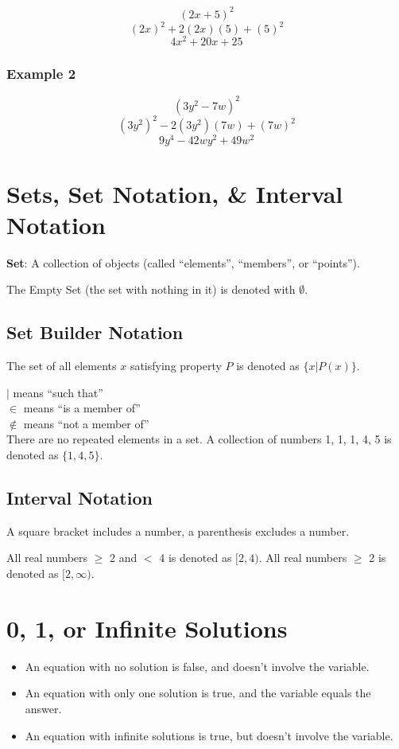\documentclass{article}
\begin{document}
$$(2x + 5)^2$$
$$(2x)^2 + 2(2x)(5) + (5)^2$$
$$4x^2 + 20x + 25$$

\subsubsection{Example 2}
$$ (3y^2 - 7w)^2 $$
$$ (3y^2)^2 - 2(3y^2)(7w) + (7w)^2$$
$$ 9y^4 - 42wy^2 + 49w^2 $$ 

\section{Sets, Set Notation, \& Interval Notation}
\noindent \textbf{Set}: A collection of objects (called ``elements'', ``members'', or ``points'').

The Empty Set (the set with nothing in it) is denoted with $\emptyset$. 
\subsection{Set Builder Notation}
The set of all elements $x$ satisfying property $P$ is denoted as $\{x | P(x)\}$.

$|$ means ``such that'' \\ 
$\in$ means ``is a member of''\\
$\notin$ means ``not a member of''\\
There are no repeated elements in a set. A collection of numbers 1, 1, 1, 4, 5 is denoted as $\{1,4,5\}$.
\subsection{Interval Notation}
A square bracket includes a number, a parenthesis excludes a number.

All real numbers $\geq$ 2 and $<$ 4 is denoted as $[2, 4)$.
All real numbers $\geq$ 2 is denoted as $[2,\infty)$.

\section{0, 1, or Infinite Solutions}

\begin{itemize}
\item An equation with no solution is false, and doesn't involve the variable.

\item An equation with only one solution is true, and the variable equals the answer.

\item An equation with infinite solutions is true, but doesn't involve the variable.
\end{itemize}
\end{document}
